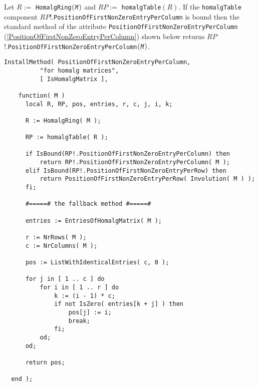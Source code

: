 \documentclass[a4paper,11pt]{report}
\begin{document}
{{{ Let $R :=$ \texttt{HomalgRing}$( \mbox{\texttt{\mdseries\slshape M}} )$ and $RP :=$ \texttt{homalgTable}$( R )$. If the \texttt{homalgTable} component $RP$!.\texttt{PositionOfFirstNonZeroEntryPerColumn} is bound then the standard method of the attribute \texttt{PositionOfFirstNonZeroEntryPerColumn} (\ref{PositionOfFirstNonZeroEntryPerColumn}) shown below returns $RP$!.\texttt{PositionOfFirstNonZeroEntryPerColumn}$( \mbox{\texttt{\mdseries\slshape M}} )$. 
\begin{Verbatim}[fontsize=\small,frame=single,label=Code]
  InstallMethod( PositionOfFirstNonZeroEntryPerColumn,
          "for homalg matrices",
          [ IsHomalgMatrix ],
          
    function( M )
      local R, RP, pos, entries, r, c, j, i, k;
      
      R := HomalgRing( M );
      
      RP := homalgTable( R );
      
      if IsBound(RP!.PositionOfFirstNonZeroEntryPerColumn) then
          return RP!.PositionOfFirstNonZeroEntryPerColumn( M );
      elif IsBound(RP!.PositionOfFirstNonZeroEntryPerRow) then
          return PositionOfFirstNonZeroEntryPerRow( Involution( M ) );
      fi;
      
      #=====# the fallback method #=====#
      
      entries := EntriesOfHomalgMatrix( M );
      
      r := NrRows( M );
      c := NrColumns( M );
      
      pos := ListWithIdenticalEntries( c, 0 );
      
      for j in [ 1 .. c ] do
          for i in [ 1 .. r ] do
              k := (i - 1) * c;
              if not IsZero( entries[k + j] ) then
                  pos[j] := i;
                  break;
              fi;
          od;
      od;
      
      return pos;
      
  end );
\end{Verbatim}
 }

 }

  }
\end{document}
